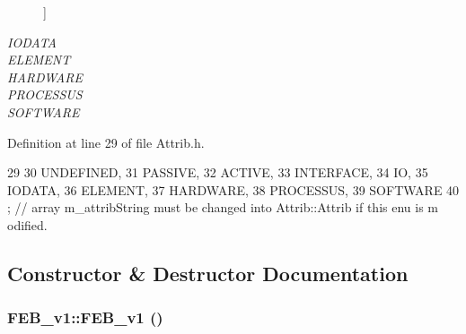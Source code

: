 \begin{Desc}
\begin{description}
{}]\item[{\em 
\hypertarget{classAttrib_a69e171d7cc6417835a5a306d3c764235a0af3b0d0ac323c1704e6c69cf90add28}{
IODATA}
\label{classAttrib_a69e171d7cc6417835a5a306d3c764235a0af3b0d0ac323c1704e6c69cf90add28}
}]\item[{\em 
\hypertarget{classAttrib_a69e171d7cc6417835a5a306d3c764235a7788bc5dd333fd8ce18562b269c9dab1}{
ELEMENT}
\label{classAttrib_a69e171d7cc6417835a5a306d3c764235a7788bc5dd333fd8ce18562b269c9dab1}
}]\item[{\em 
\hypertarget{classAttrib_a69e171d7cc6417835a5a306d3c764235a61ceb22149f365f1780d18f9d1459423}{
HARDWARE}
\label{classAttrib_a69e171d7cc6417835a5a306d3c764235a61ceb22149f365f1780d18f9d1459423}
}]\item[{\em 
\hypertarget{classAttrib_a69e171d7cc6417835a5a306d3c764235a75250e29692496e73effca2c0330977f}{
PROCESSUS}
\label{classAttrib_a69e171d7cc6417835a5a306d3c764235a75250e29692496e73effca2c0330977f}
}]\item[{\em 
\hypertarget{classAttrib_a69e171d7cc6417835a5a306d3c764235a103a67cd0b8f07ef478fa45d4356e27b}{
SOFTWARE}
\label{classAttrib_a69e171d7cc6417835a5a306d3c764235a103a67cd0b8f07ef478fa45d4356e27b}
}]\end{description}
\end{Desc}



Definition at line 29 of file Attrib.h.


\begin{DoxyCode}
29                 {
30     UNDEFINED,
31     PASSIVE,
32     ACTIVE,
33     INTERFACE,
34     IO,
35     IODATA,
36     ELEMENT,
37     HARDWARE,
38     PROCESSUS,
39     SOFTWARE 
40   }; // array m_attribString must be changed into Attrib::Attrib if this enu is m
      odified. 
\end{DoxyCode}


\subsection{Constructor \& Destructor Documentation}
\hypertarget{classFEB__v1_aad65ff3d95f3f60583dad914f9c18a9d}{
\subsubsection[{FEB\_\-v1}]{\setlength{\rightskip}{0pt plus 5cm}FEB\_\-v1::FEB\_\-v1 ()}}
\label{classFEB__v1_aad65ff3d95f3f60583dad914f9c18a9d}


